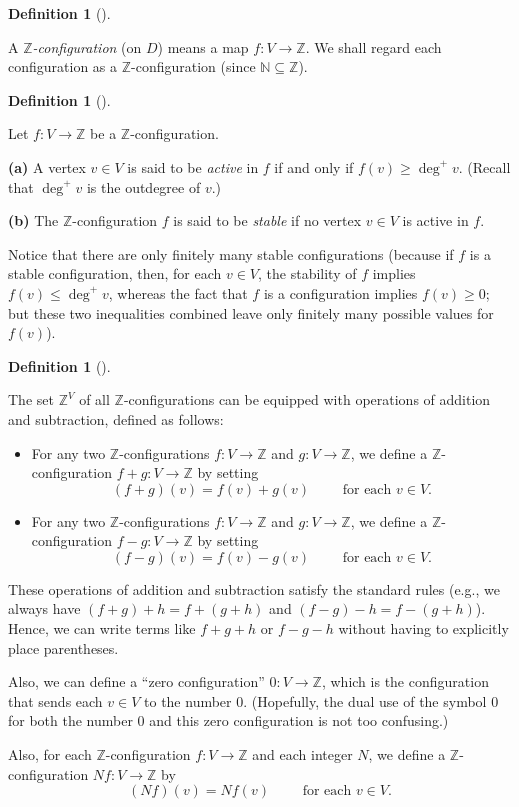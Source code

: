 \documentclass[numbers=enddot,12pt,final,onecolumn,notitlepage]{scrartcl}%
\theoremstyle{definition}
\newtheorem{defi}[theo]{Definition}
\newenvironment{definition}[1][]
{\begin{defi}[#1]\begin{leftbar}}
{\end{leftbar}\end{defi}}
\newcommand{\NN}{\mathbb{N}}
\newcommand{\ZZ}{\mathbb{Z}}
\newcommand{\tup}[1]{\left( #1 \right)}
\begin{document}
\begin{definition}
A \textit{$\ZZ$-configuration} (on $D$) means a map
$f : V \to \ZZ$.
We shall regard each configuration as a $\ZZ$-configuration
(since $\NN \subseteq \ZZ$).
\end{definition}

\begin{definition}
Let $f : V \to \ZZ$ be a $\ZZ$-configuration.

\textbf{(a)} A vertex $v \in V$ is said to be
\textit{active} in $f$ if and only if
$f\tup{v} \geq \deg^+ v$.
(Recall that $\deg^+ v$ is the outdegree of $v$.)

\textbf{(b)} The $\ZZ$-configuration $f$ is said to be
\textit{stable} if no vertex $v \in V$ is active in $f$.
\end{definition}

Notice that there are only finitely many stable configurations
(because if $f$ is a stable configuration, then, for each
$v \in V$, the stability of $f$ implies $f \tup{v} \leq \deg^+ v$,
whereas the fact that $f$ is a configuration implies
$f \tup{v} \geq 0$; but these two inequalities combined
leave only finitely many possible values for $f \tup{v}$).

\begin{definition} \label{def.chip.add-configs}
The set $\ZZ^V$ of all $\ZZ$-configurations can be equipped with
operations of addition and subtraction, defined as follows:

\begin{itemize}
 \item For any two $\ZZ$-configurations $f : V \to \ZZ$ and
       $g : V \to \ZZ$, we define a $\ZZ$-configuration
       $f + g : V \to \ZZ$ by setting
       \[
        \tup{f + g} \tup{v}
        = f \tup{v} + g \tup{v}
        \qquad \text{ for each } v \in V .
       \]

 \item For any two $\ZZ$-configurations $f : V \to \ZZ$ and
       $g : V \to \ZZ$, we define a $\ZZ$-configuration
       $f - g : V \to \ZZ$ by setting
       \[
        \tup{f - g} \tup{v}
        = f \tup{v} - g \tup{v}
        \qquad \text{ for each } v \in V .
       \]
\end{itemize}

These operations of addition and subtraction satisfy the
standard rules (e.g., we always have
$\tup{f+g} + h = f + \tup{g+h}$ and
$\tup{f-g} - h = f - \tup{g+h}$).
Hence, we can write terms like $f + g + h$ or $f - g - h$
without having to explicitly place parentheses.

Also, we can define a ``zero configuration'' $0 : V \to \ZZ$,
which is the configuration that sends each $v \in V$ to the
number $0$.
(Hopefully, the dual use of the symbol $0$ for both the number
$0$ and this zero configuration is not too confusing.)

Also, for each $\ZZ$-configuration $f : V \to \ZZ$ and each
integer $N$, we define a $\ZZ$-configuration $Nf : V \to \ZZ$
by
\[
\tup{Nf} \tup{v} = N f \tup{v}
\qquad \text{ for each } v \in V .
\]
\end{definition}
\end{document}
